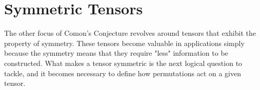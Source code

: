 \documentclass[../Lael_John_MasterThesis_Draft.tex]{subfiles}
\begin{document}


\section{Symmetric Tensors}\label{section:symmetrictensors}
The other focus of Comon's Conjecture revolves around tensors that exhibit the property of symmetry. These tensors become valuable in applications simply because the symmetry means that they require "less" information to be constructed. What makes a tensor symmetric is the next logical question to tackle, and it becomes necessary to define how permutations act on a given tensor.
\end{document}
